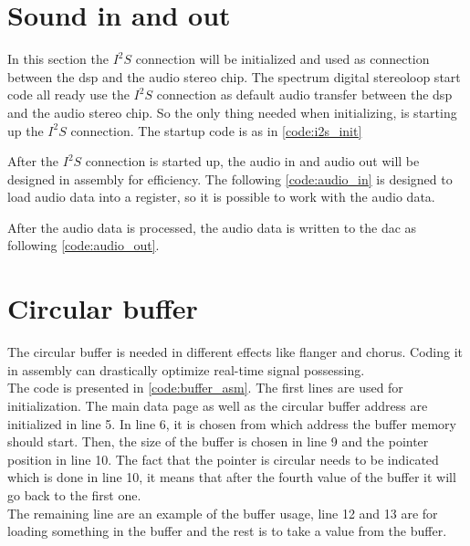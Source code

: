 \section{Sound in and out}
In this section the $I^2S$ connection will be initialized and used as connection between the \gls{dsp} and the audio stereo chip. The spectrum digital stereoloop start code \citep{stereoloop} all ready use the $I^2S$ connection as default audio transfer between the \gls{dsp} and the audio stereo chip. So the only thing needed when initializing, is starting up the $I^2S$ connection. The startup code is as in \autoref{code:i2s_init}

After the $I^2S$ connection is started up, the audio in and audio out will be designed in assembly for efficiency. The following \autoref{code:audio_in} is designed to load audio data into a register, so it is possible to work with the audio data. 

After the audio data is processed, the audio data is written to the \gls{dac} as following \autoref{code:audio_out}.

\section{Circular buffer}

The circular buffer is needed in different effects like flanger and chorus. Coding it in assembly can drastically optimize real-time signal possessing. \\

The code is presented in \autoref{code:buffer_asm}. The first lines are used for initialization. The main data page as well as the circular buffer address are initialized in line 5. In line 6, it is chosen from which address the buffer memory should start. Then, the size of the buffer is chosen in line 9 and the pointer position in line 10. The fact that the pointer is circular needs to be indicated which is done in line 10, it means that after the fourth value of the buffer it will go back to the first one.\\

The remaining line are an example of the buffer usage, line 12 and 13 are for loading something in the buffer and the rest is to take a value from the buffer. 







